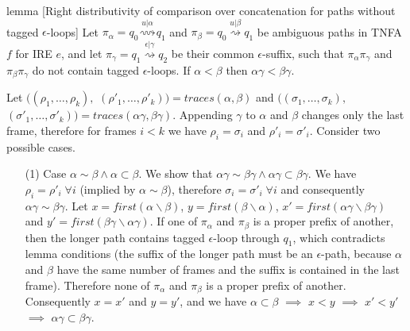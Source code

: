 \documentclass[AMA,STIX1COL]{WileyNJD-v2}
\begin{document}
\begin{theoremEnd}[restate, no link to proof, no link to theorem, category=lemmata_closure]{lemma}
[Right distributivity of comparison over concatenation for paths without tagged $\epsilon$-loops]
    \label{lemma_closure_rightdist}
    Let
    $\pi_\alpha = q_0 \overset {u | \alpha} {\rightsquigarrow} q_1$ and
    $\pi_\beta  = q_0 \overset {u | \beta}  {\rightsquigarrow} q_1$
    be ambiguous paths in TNFA $f$ for IRE $e$,
    and let $\pi_\gamma = q_1 \overset {\epsilon | \gamma} {\rightsquigarrow} q_2$
    be their common $\epsilon$-suffix,
    such that $\pi_\alpha \pi_\gamma$ and $\pi_\beta \pi_\gamma$ do not contain tagged $\epsilon$-loops.
    If $\alpha < \beta$ then $\alpha \gamma < \beta \gamma$.
\end{theoremEnd}
\begin{proofEnd}
    Let
    $\big( (\rho_1, \hdots, \rho_k),$ $(\rho'_1, \hdots, \rho'_k) \big) = traces (\alpha, \beta)$ and
    $\big( (\sigma_1, \hdots, \sigma_k),$ $(\sigma'_1, \hdots, \sigma'_k) \big) = traces (\alpha \gamma, \beta \gamma)$.
    Appending $\gamma$ to $\alpha$ and $\beta$ changes only the last frame, therefore
    for frames $i < k$ we have $\rho_i = \sigma_i$ and $\rho'_i = \sigma'_i$.
    Consider two possible cases.
    \begin{itemize}[itemsep=0.5em, topsep=0.5em]
    \item[(1)]
        Case $\alpha \sim \beta \wedge \alpha \subset \beta$.
        We show that $\alpha \gamma \sim \beta \gamma \wedge \alpha \gamma \subset \beta \gamma$.
        We have $\rho_i = \rho'_i \; \forall i$ (implied by $\alpha \sim \beta$), therefore
        $\sigma_i = \sigma'_i \; \forall i$ and consequently $\alpha \gamma \sim \beta \gamma$.
        Let
        $x = first (\alpha \backslash \beta)$,
        $y = first (\beta \backslash \alpha)$,
        $x' = first (\alpha \gamma \backslash \beta \gamma)$ and
        $y' = first (\beta \gamma \backslash \alpha \gamma)$.
        If one of $\pi_\alpha$ and $\pi_\beta$ is a proper prefix of another,
        then the longer path contains tagged $\epsilon$-loop through $q_1$,
        which contradicts lemma conditions
        (the suffix of the longer path must be an $\epsilon$-path,
        because $\alpha$ and $\beta$ have the same number of frames
        and the suffix is contained in the last frame).
        Therefore none of $\pi_\alpha$ and $\pi_\beta$ is a proper prefix of another.
        Consequently $x = x'$ and $y = y'$, and we have
        $\alpha \subset \beta$
        $\implies$
        $x < y$
        $\implies$
        $x' < y'$
        $\implies$
        $\alpha \gamma \subset \beta \gamma$.


\end{itemize}
\end{proofEnd}
\end{document}
